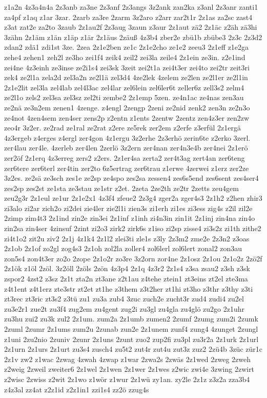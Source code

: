 {z1a2n
4z3a4n4a
2z3anb
za3ne
2z3anf
2z3angs
3z2ank
zan2ka
z3anl
2z3anr
zanti1
za4pf
z1aq
z1ar
3zar.
2zarb
za3re
2zarm
3z2aro
z2arr
zar2t1r
2z1as
za2sc
zast4
z3at
zat2e
za2to
3zaub
2z1au2f
2z3aug
3zaun
z3aur
2z1aut
zä2
2z1äc
z2äh
zä3hi
3zähn
2z1äm
z1än
z1äp
z1är
2z1äus
2zäuß
4z3b4
zber2e
zbü1b
zbübe3
2z3c
2z3d2
zdan2
zdä1
zdi1st
3ze.
2zea
2z1e2ben
ze1c
2z1e2cho
ze1e2
zeeu3
2z1eff
z1e2ga
zehe4
zehen1
zeh2l
ze3ho
zei1f4
zeik4
zeil2
zei3la
zeile4
2z1ein
ze3in.
z2e1ind
zei4ne
4z3einh
ze3inse
ze2i1s4
zei3sk
3zeit
zei2t1a
zei4t3er
zei4to
zei2tr
zeit3ri
zek4
ze2l1a
zela2d
zel3a2n
ze2l1ä
zel3d4
4ze2lek
4zelem
ze2len
ze2l1er
ze2l1in
2z1e2lit
zel3la
zel4lab
zel4l3ac
zel4lar
zel6lein
zel6ler6t
zeller6z
zell3s2
zelm4
ze2l1o
zels2
zel3sa
zel3sz
zel2ti
zembe2
2z1emp
5zen.
ze4n1ac
ze4nas
zen3au
ze2nä
ze3n2em
zenen1
4zenge.
z4engl
2zengp
2zeni
ze2nid
zenk2
zen3n
ze2n3o
ze4not
4zen4sem
zen4ser
zens2p
z2entn
z1ents
2zentw
2zentz
zen4z3er
zen2zw
zeo4r
3z2er.
ze2rad
ze1ral
ze2rat
z2ere
ze5rek
zer2em
z2erfe
z3erfül
2z1ergä
4z3ergeb
z4erges
z4ergl
zer4gon
4z1ergu
3z2erhe
2z3erhö
zerin6te
z2erko
3zerl.
zer4lau
zer4le.
4zerleb
zer4len
2zerlö
3z2ern
zer4nan
zer4n3e4b
zer4nei
2z1erö
zer2öf
2z1erq
4z3erreg
zers2
z2ers.
2z1er4sa
zerta2
zer4t3ag
zert4an
zer6teng
zer6tere
zer6terl
zer4tin
zer2to
6z5ertrag
zer6trau
z1erwe
4zerwei
z1erz
zer2ze
3z2es.
ze2sä
ze3sch
zes1e
ze2sp
ze4spo
zes2sa
zessen4
zes6s5end
zes6sent
zes4ser4
zes2sp
zes2st
ze1sta
ze3stau
ze1str
z2et.
2zeta
2ze2th
ze2tr
2zetts
zeu4gem
zeu2g3r
2z1eul
ze1ur
2z1e2x1
4z3f4
zfeue2
2z3g4
zger2a
zger4s3
2z1h2
z2hen
zhir3
zi3alo
zi2ar
zich2o
zi2dei
zie4ler
zie2l1i
zien3s
zi1erh
zi1es
zi3ess
zig4s
z2il
zil2e
2zimp
zim4t3
2z1ind
zin2e
zin3ei
2z1inf
z1inh
zi4n3in
zin1it
2z1inj
zin4na
zin4o
zin2sa
zin4ser
4zinsuf
2zint
zi2o3
zirk2
zirk6s
z1iso
zi2sp
zisse4
zi3s2z
zi1th
zithe2
zi4t1o2
zit2u
ziv2
2z1j
4z1k4
2z1l2
zlei3ti
zle1s
z3ly
2z3m2
zme2e
2z3n2
z3oas
2z1ob
2z1of
zo2gl
zog4s3
2z1oh
zol2la
zoller4
zol6lerl
zol6lert
zonal2
zon3au
zon5s4
zon4t3er
zo2o
2zope
2z1o2r
zo3re
3z2orn
zor4ne
2z1osz
2z1ou
2z1o2z
2zö2f
2z1ök
z1öl
2zöl.
3z2öll
2zöls
2zön
4z3p4
2z1q
4z3r2
2z1s4
z3sa
zsau2
z3sh
z3sk
zspor2
4zst2
z3sz
2z1t
zta2n
zt3ane
z2t1au
z4tehe
ztein1
zt3eins
zt2el
zte3ma
z4t1ent
z4t1erz
zte3str
zt2et
zt1he
z3them
z3t2her
zt1hi
zt3ho
z3thr
z3thy
z3ti
zt3rec
zt3ric
zt3s2
z3tü
zu1
zu3a
zub4
3zuc
zuch2e
zucht3r
zud4
zudi4
zu2el
zu3e2r1
zue2t
zu3f4
zug2em
zu4gent
zug2i
zu3gl
zu4gla
zu4glö
zu2go
2z1uhr
zu3hu
zui2
zu3k
zul2
2z1um.
zum2a
2z1umb
zumen2
2zumf
2zumg
zum2i
2zumk
2zuml
2zumr
2z1ums
zum2u
2zunab
zun2e
2z1unem
zunf4
zung4
4zunget
2zungl
z1uni
2zu2nio
2zuniv
2zunr
2z1uns
2zunt
zuo2
zup2fi
zu3pl
zu3r2a
2z1urk
2z1url
2z1urn
2z1urs
2z1urt
zu3s4
zusch4
zu5t2
zut4r
zut4u
zut3z
zuz2
2zü4b
3züc
zür1c
2z1v
zw2
z1wac
2zwag
4zwah
4zwap
z1war
2zwa2s
2zwäs
2z1wed
2zweg
2zweh
z2weig
2zweil
zweiter6
2z1wel
2z1wen
2z1wer
2z1wes
z2wic
zwi4e
3zwing
2zwirt
z2wisc
2zwiss
z2wit
2z1wo
z1wör
z1wur
2z1wü
zy1an.
zy2le
2z1z
z3z2a
zza3b4
z4z3al
zz4at
z2z1id
z2z1in1
zzi1s4
zz2ö
zzug4s
}
